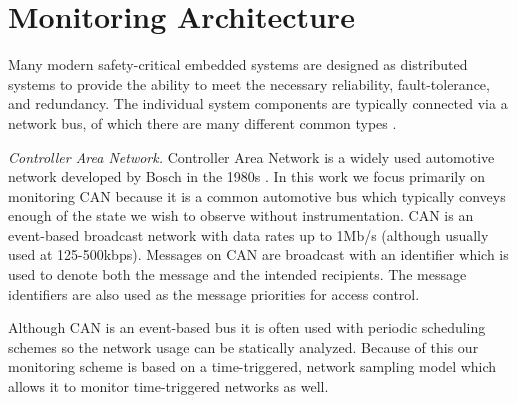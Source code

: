 
\section{Monitoring Architecture}

Many modern safety-critical embedded systems are designed as distributed systems to provide the ability to meet the necessary reliability, fault-tolerance, and redundancy. The individual system components are typically connected via a network bus, of which there are many different common types \cite{Rushby2001}. %
%

\textit{Controller Area Network.} %
Controller Area Network is a widely used automotive network developed by Bosch in the 1980s \cite{Bosch1991}.
In this work we focus primarily on monitoring CAN because it is a common automotive bus which typically conveys enough of the state we wish to observe without instrumentation.
%
CAN is an event-based broadcast network with data rates up to 1Mb/s (although usually used at 125-500kbps). Messages on CAN are broadcast with an identifier which is used to denote both the message and the intended recipients. The message identifiers are also used as the message priorities for access control.

Although CAN is an event-based bus it is often used with periodic scheduling schemes so the network usage can be statically analyzed. Because of this our monitoring scheme is based on a time-triggered, network sampling model which allows it to monitor time-triggered networks as well.

